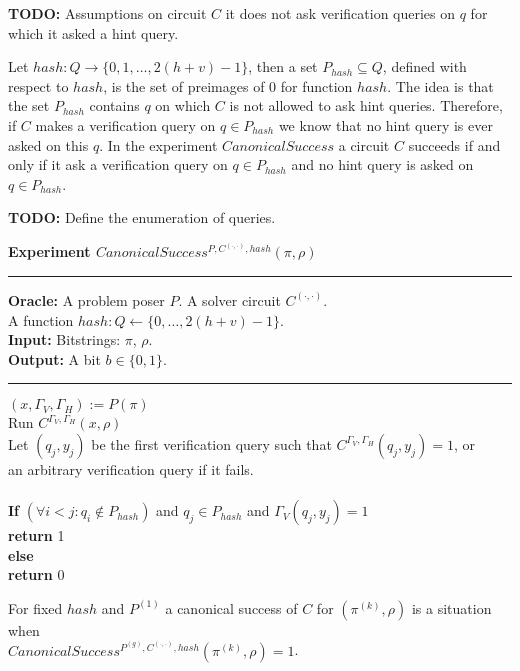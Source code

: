 \begin{todo}
  \textbf{TODO:} Assumptions on circuit $C$ it does not ask verification queries on $q$ for which it asked a hint query.
\end{todo}

Let $hash:Q\rightarrow\{0,1,\dots, 2(h+v)-1\}$, then a set $P_{hash} \subseteq Q$,
defined with respect to $hash$, is the set of preimages of $0$ for function $hash$.
The idea is that the set $P_{hash}$ contains $q$ on which $C$ is not allowed to ask hint queries.
Therefore, if $C$ makes a verification query on $q \in P_{hash}$ we know that no hint query is ever asked on this $q$.
In the experiment $CanonicalSuccess$ a circuit $C$ succeeds if and only if it ask a verification query on $q \in P_{hash}$
and no hint query is asked on $q \in P_{hash}$.
%
\begin{todo}
  \textbf{TODO:} Define the enumeration of queries.
\end{todo}
%
\begin{codeblock}
  \textbf{Experiment $CanonicalSuccess^{P, C^{(\cdot, \cdot)}, hash}(\pi, \rho)$}
  \medskip

  \hrule

  \medskip
  \textbf{Oracle:} A problem poser $P$. A solver circuit $C^{(\cdot, \cdot)}$.\\
  \IndII A function $hash: Q \leftarrow \{0, \dots, 2(h+v) - 1\}$.\\
  \textbf{Input:}  Bitstrings: $\pi$, $\rho$. \\
  \textbf{Output:} A bit $b \in \{0,1\}$.

  \medskip\hrule\medskip
  $(x, \Gamma_V, \Gamma_H) := P(\pi)$\\
  Run $C^{\Gamma_V, \Gamma_H} (x, \rho)$ \\
  \IndI Let $(q_j,y_j)$ be the first verification query such that $C^{\Gamma_V, \Gamma_H}(q_j, y_j) = 1$, or \\
  \IndI an arbitrary verification query if it fails.\\
  \\
  \textbf{If} $(\forall i < j :  q_i \notin P_{hash} )$ and $q_j \in P_{hash}$ and $\Gamma_V(q_j, y_j) = 1$ \\
  \IndI \textbf{return} 1\\
  \textbf{else}\\
  \IndI \textbf{return} 0
\end{codeblock}
%
For fixed $hash$ and $P^{(1)}$ a canonical success of $C$ for $(\pi^{(k )}, \rho)$ is a situation when \\ $CanonicalSuccess^{P^{(g)}, C^{(\cdot, \cdot)}, hash}(\pi^{(k)}, \rho) = 1$.
